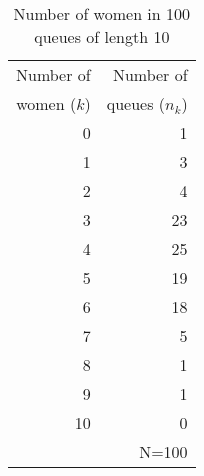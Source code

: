 \begin{table}[htb]
\caption{Number of women in 100 queues of length 10}
\label{tab:queues}
 \begin{center}
  \begin{tabular}{rr}
  \hline
Number of  & Number of \\
women ($k$) &  queues ($n_k$)\\
  \hline
0 & 1 \\
1 & 3 \\
2 & 4 \\
3 & 23 \\
4 & 25 \\
5 & 19 \\
6 & 18 \\
7 & 5 \\
8 & 1 \\
9 & 1 \\
10 & 0 \\
  & N=100 \\
  \hline
  \end{tabular}
 \end{center}
\end{table}

